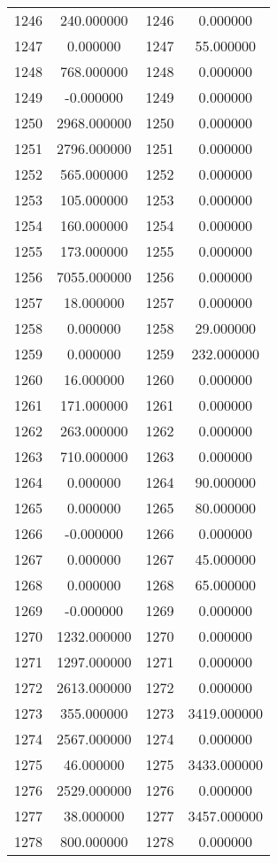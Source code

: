 \documentclass[12pt]{article}
\begin{document}
\begin{longtable}{@{}cccc@{}}
1246 & 240.000000 & 1246 & 0.000000 \\
1247 & 0.000000 & 1247 & 55.000000 \\
1248 & 768.000000 & 1248 & 0.000000 \\
1249 & -0.000000 & 1249 & 0.000000 \\
1250 & 2968.000000 & 1250 & 0.000000 \\
1251 & 2796.000000 & 1251 & 0.000000 \\
1252 & 565.000000 & 1252 & 0.000000 \\
1253 & 105.000000 & 1253 & 0.000000 \\
1254 & 160.000000 & 1254 & 0.000000 \\
1255 & 173.000000 & 1255 & 0.000000 \\
1256 & 7055.000000 & 1256 & 0.000000 \\
1257 & 18.000000 & 1257 & 0.000000 \\
1258 & 0.000000 & 1258 & 29.000000 \\
1259 & 0.000000 & 1259 & 232.000000 \\
1260 & 16.000000 & 1260 & 0.000000 \\
1261 & 171.000000 & 1261 & 0.000000 \\
1262 & 263.000000 & 1262 & 0.000000 \\
1263 & 710.000000 & 1263 & 0.000000 \\
1264 & 0.000000 & 1264 & 90.000000 \\
1265 & 0.000000 & 1265 & 80.000000 \\
1266 & -0.000000 & 1266 & 0.000000 \\
1267 & 0.000000 & 1267 & 45.000000 \\
1268 & 0.000000 & 1268 & 65.000000 \\
1269 & -0.000000 & 1269 & 0.000000 \\
1270 & 1232.000000 & 1270 & 0.000000 \\
1271 & 1297.000000 & 1271 & 0.000000 \\
1272 & 2613.000000 & 1272 & 0.000000 \\
1273 & 355.000000 & 1273 & 3419.000000 \\
1274 & 2567.000000 & 1274 & 0.000000 \\
1275 & 46.000000 & 1275 & 3433.000000 \\
1276 & 2529.000000 & 1276 & 0.000000 \\
1277 & 38.000000 & 1277 & 3457.000000 \\
1278 & 800.000000 & 1278 & 0.000000 \\

\end{longtable}
\end{document}
